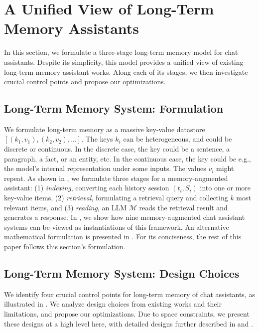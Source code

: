 \section{A Unified View of Long-Term Memory Assistants}
\label{section-unified-view}


In this section, we formulate a three-stage long-term memory model for chat assistants. Despite its simplicity, this model provides a unified view of existing long-term memory assistant works. Along each of its stages, we then investigate crucial control points and propose our optimizations.


 \subsection{Long-Term Memory System: Formulation}


We formulate long-term memory as a massive key-value datastore $[(k_1, v_1), (k_2, v_2), ...]$. The keys $k_i$ can be heterogeneous, and could be discrete or continuous. In the discrete case, the key could be a sentence, a paragraph, a fact, or an entity, etc. In the continuous case, the key could be e.g., the model’s internal representation under some inputs. The values $v_i$ might repeat. As shown in , we formulate three stages for a memory-augmented assistant: (1) \textit{indexing}, converting each history session $(t_i, S_i)$ into one or more key-value items, (2) \textit{retrieval}, formulating a retrieval query and collecting $k$ most relevant items, and (3) \textit{reading}, an LLM $\mathcal{M}$ reads the retrieval result and generates a response. {In , we show how nine memory-augmented chat assistant systems can be viewed as instantiations of this framework. An alternative mathematical formulation is presented in . For its conciseness, the rest of this paper follows this section's formulation.}

\subsection{Long-Term Memory System: Design Choices}
\label{section-design-choices}

We identify four crucial control points for long-term memory of chat assistants, as illustrated in . We analyze design choices from existing works and their limitations, and propose our optimizations. Due to space constraints, we present these designs at a high level here, with detailed designs further described in  and .

